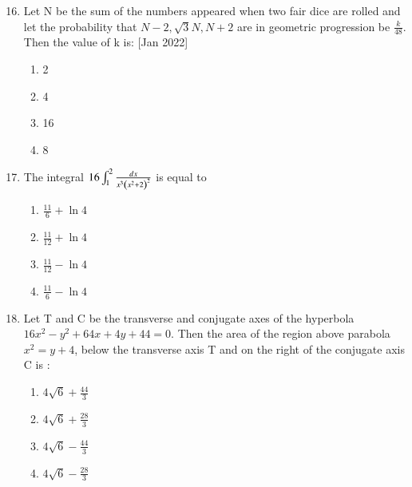 \documentclass[journal]{IEEEtran}
\begin{document}
\begin{enumerate}
\setcounter{enumi}{15}
 
    \item Let N be the sum of the numbers appeared when two fair dice are rolled and let the probability that $N-2,\sqrt{3}N,N+2$ are in geometric progression be $\frac{k}{48}$. Then the value of k is:
	    \hfill{[Jan 2022]}
        \begin{multicols}{1}
            \begin{enumerate}
                \item 2
                \item 4
                \item 16
                \item 8
            \end{enumerate}
        \end{multicols}

    \item The integral $16\int_{1}^{2} \frac{dx}{x^3\left(x^2+2\right)^2}$ is equal  to 

		\begin{multicols}{4}
			\begin{enumerate}
				\item $\frac{11}{6}+\ln{4}$
				\item  $\frac{11}{12}+\ln{4}$
				\item  $\frac{11}{12}-\ln{4}$
				\item  $\frac{11}{6}-\ln{4}$
			\end{enumerate}
		\end{multicols}

    \item Let T and C be  the transverse and conjugate axes of the hyperbola $16x^2-y^2+64x+4y+44=0.$ Then the area of the region above parabola $x^2=y+4$, below the transverse axis T and on the right of the conjugate axis C is :
        \begin{multicols}{4}
            \begin{enumerate}
               \item $4\sqrt{6}+\frac{44}{3}$
               \item $4\sqrt{6}+\frac{28}{3}$
               \item $4\sqrt{6}-\frac{44}{3}$
               \item $4\sqrt{6}-\frac{28}{3}$
            \end{enumerate}
        \end{multicols}


\end{enumerate}
\end{document}
